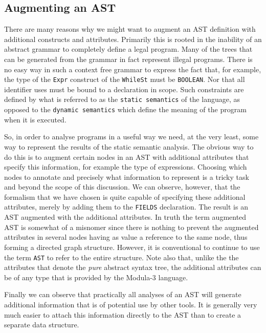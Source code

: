 {{\subsection{Augmenting an AST}
\par
There are many reasons why we might want to augment an AST definition
with additional constructs and attributes. Primarily this is rooted in
the inability of an abstract grammar to completely define a legal
program. Many of the trees that can be generated from the grammar in
fact represent illegal programs. There is no easy way in such a
context free grammar to express the fact that, for example, the type
of the {\tt Expr} construct of the {\tt WhileSt} must be {\tt BOOLEAN}. Nor that
all identifier uses must be bound to a declaration in scope.  Such
constraints are defined by what is referred to as the {\tt static
semantics} of the language, as opposed to the {\tt dynamic semantics}
which define the meaning of the program when it is executed.
\par
So, in order to analyse programs in a useful way we need, at the very
least, some way to represent the results of the static semantic
analysis.  The obvious way to do this is to augment certain nodes in
an AST with additional attributes that specify this information, for
example the type of expressions.  Choosing which nodes to annotate
and precisely what information to represent is a tricky task and
beyond the scope of this discussion. We can observe, however, that the
formalism that we have chosen is quite capable of specifying these
additional attributes, merely by adding them to the {\tt FIELDS}
declaration. The result is an AST augmented with the additional
attributes. In truth the term augmented AST is somewhat of a misnomer
since there is nothing to prevent the augmented attributes in several
nodes having as value a reference to the same node, thus forming a
directed graph structure. However, it is conventional to continue to
use the term {\tt AST} to refer to the entire structure. Note also that, unlike
the the attributes that denote the {\it pure} abstract syntax tree,
the additional attributes can be of any type that is provided by the
Modula-3 language.
\par
Finally we can observe that practically all analyses of an AST will
generate additional information that is of potential use by other
tools.  It is generally very much easier to attach this information
directly to the AST than to create a separate data structure.
\par
}}

